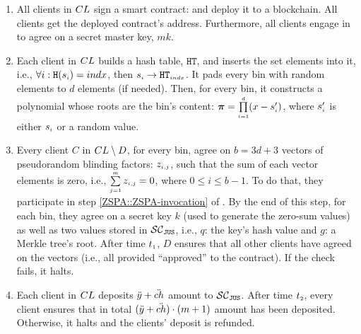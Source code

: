 \begin{enumerate}


\item\label{gen-FPSI-cont} All clients in ${CL}$ sign a smart contract: \scf and deploy it to a blockchain. All clients get the deployed contract's address. Furthermore, all clients engage in \ct to agree on a secret master key, $mk$.

\item \label{encode-encrypt} Each client in ${CL}$  builds a  hash table,  $\mathtt{HT}$, and inserts the set elements into  it, i.e.,  $\forall i: \mathtt{H}( s_{\scriptscriptstyle i})={indx}$, then $ s_{\scriptscriptstyle i}\rightarrow \mathtt{HT}_{\scriptscriptstyle indx}$. It pads every bin with random elements to $d$ elements (if needed). Then,  for every bin, it constructs   a polynomial whose roots are  the bin's content: $\bm\pi=\prod\limits^{\scriptscriptstyle d}_{\scriptscriptstyle i=1} (x-s'_{\scriptscriptstyle i})$, where $s'_{\scriptscriptstyle i}$ is either $s_{\scriptscriptstyle i}$ or a random value. 
%
\item \label{ZSPA} Every client $ C$ in ${CL}\setminus D$, for every bin, agree on $b=3d+3$ vectors of pseudorandom blinding factors: $z_{\scriptscriptstyle i,j}$, such that the sum of each vector elements is zero, i.e., $\sum\limits^{\scriptscriptstyle m}_{\scriptscriptstyle j=1}z_{\scriptscriptstyle i,j}=0$, where $0\leq i\leq b-1$. To do that, they participate in step \ref{ZSPA::ZSPA-invocation} of \zspaa. By the end of this step, for each bin, they agree on a secret key $k$ (used to generate the zero-sum values) as well as two values stored in $\mathcal{SC}_{\mathtt{JUS}}$, i.e., $q$: the  key's hash value and $g$: a Merkle tree's root. After time $t_{\scriptscriptstyle 1}$,  $D$ ensures that all other clients have agreed on the vectors (i.e., all provided ``approved''  to the contract). If the check fails, it halts. 
%
\item\label{F-PSI::each-client-deposit} Each client in ${CL}$ deposits $\ddot{y}+\ddot{ch}$ amount to $\mathcal{SC}_{\mathtt{JUS}}$. After time $t_{\scriptscriptstyle 2}$, every client ensures that in total $(\ddot{y}+\ddot{ch})\cdot (m+1)$ amount has been deposited. Otherwise, it halts and the clients' deposit is refunded. 








\end{enumerate}
